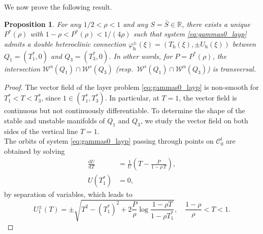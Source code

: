 \documentclass[a4paper,10pt,abstract=true,parskip=true]{scrartcl}
\newtheorem{prop}[thm]{Proposition}
\theoremstyle{remark}
\numberwithin{equation}{section}
\numberwithin{thm}{section}
\begin{document}
We now prove the following result.
\begin{prop} \label{prop:hetconn}
    For any $1/2 < \rho < 1$ and any $S=\bar{S} \in \mathbb{R}$, there exists a unique $P^\ast(\rho)$ with $1-\rho < P^\ast(\rho) < 1/(4\rho)$ such that system \eqref{eq:gammas0_layp} admits a double heteroclinic connection $\varphi_\mathrm{h}^\pm(\xi) = \left(T_\mathrm{h}(\xi),\pm U_\mathrm{h}(\xi)\right)$ between $Q_1=(T_1^\ast, 0 )$ and $Q_3=(T_3^\ast, 0 )$. In other words, for $P = P^\ast(\rho)$, the intersection $\mathcal{W}^{u}(Q_1) \cap \mathcal{W}^{s}(Q_3)$ (resp.~$\mathcal{W}^{s}(Q_1) \cap \mathcal{W}^{u}(Q_3)$) is transversal.
\end{prop}
\begin{proof}
The vector field of the layer problem \eqref{eq:gammas0_layp} is non-smooth for $T_1^\ast < T < T_3^\ast$, since $1 \in (T_1^\ast, T_3^\ast)$. In particular, at $T=1$, the vector field is continuous but not continuously differentiable. To determine the shape of the stable and unstable manifolds of $Q_1$ and $Q_3$, we study the vector field on both sides of the vertical line $T=1$.\\
The orbits of system \eqref{eq:gammas0_layp} passing through points on $\mathcal{C}_0^l$ are obtained by solving
\begin{equation}
\begin{aligned}
    \frac{\text{d}U}{\text{d}T} &= \frac{1}{U} \left(T - \frac{P}{1 - \rho\,T} \right), \\
    U(T_1^\ast) &= 0,
\end{aligned}
\end{equation}
by separation of variables, which leads to
\begin{equation}
    U_1^\pm (T) = 
    \pm \sqrt{T^2 - (T_1^\ast)^2 + 2 \frac{P}{\rho} \log \frac{1-\rho T}{1-\rho T_1^\ast}},\quad \frac{1-\rho}{\rho} < T < 1.

\end{equation}
\end{proof}
\end{document}

